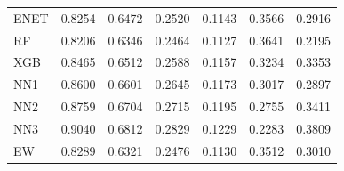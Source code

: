 \begin{table}[p]
\begin{tabular}{lrrrrrr}
ENET & 0.8254 & 0.6472 & 0.2520 & 0.1143 & 0.3566 & 0.2916 \\
RF & 0.8206 & 0.6346 & 0.2464 & 0.1127 & 0.3641 & 0.2195 \\
XGB & 0.8465 & 0.6512 & 0.2588 & 0.1157 & 0.3234 & 0.3353 \\
NN1 & 0.8600 & 0.6601 & 0.2645 & 0.1173 & 0.3017 & 0.2897 \\
NN2 & 0.8759 & 0.6704 & 0.2715 & 0.1195 & 0.2755 & 0.3411 \\
NN3 & 0.9040 & 0.6812 & 0.2829 & 0.1229 & 0.2283 & 0.3809 \\
EW & 0.8289 & 0.6321 & 0.2476 & 0.1130 & 0.3512 & 0.3010 \\
\hline
\end{tabular}
\end{table}
